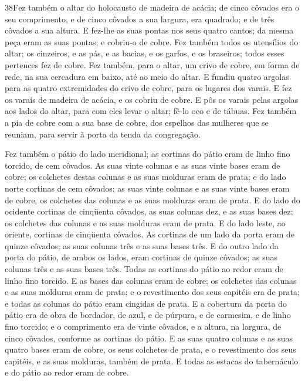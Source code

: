 \medskip

\lettrine{38} Fez também o altar do holocausto de madeira de
acácia; de cinco côvados era o seu comprimento, e de cinco côvados a
sua largura, era quadrado; e de três côvados a sua altura. E
fez-lhe as suas pontas nos seus quatro cantos; da mesma peça eram as
suas pontas; e cobriu-o de cobre. Fez também todos os utensílios
do altar; os cinzeiros, e as pás, e as bacias, e os garfos, e os
braseiros; todos esses pertences fez de cobre. Fez também, para
o altar, um crivo de cobre, em forma de rede, na sua cercadura em
baixo, até ao meio do altar. E fundiu quatro argolas para as
quatro extremidades do crivo de cobre, para os lugares dos varais.
E fez os varais de madeira de acácia, e os cobriu de cobre.
E pôs os varais pelas argolas aos lados do altar, para com eles
levar o altar; fê-lo oco e de tábuas. Fez também a pia de cobre
com a sua base de cobre, dos espelhos das mulheres que se reuniam,
para servir à porta da tenda da congregação.

Fez também o pátio do lado meridional; as cortinas do pátio eram
de linho fino torcido, de cem côvados. As suas vinte colunas
e as suas vinte bases eram de cobre; os colchetes destas colunas e
as suas molduras eram de prata; e do lado norte cortinas de
cem côvados; as suas vinte colunas e as suas vinte bases eram de
cobre, os colchetes das colunas e as suas molduras eram de prata.
E do lado do ocidente cortinas de cinqüenta côvados, as suas
colunas dez, e as suas bases dez; os colchetes das colunas e as suas
molduras eram de prata. E do lado leste, ao oriente, cortinas
de cinqüenta côvados. As cortinas de um lado da porta eram de
quinze côvados; as suas colunas três e as suas bases três. E
do outro lado da porta do pátio, de ambos os lados, eram cortinas de
quinze côvados; as suas colunas três e as suas bases três.
Todas as cortinas do pátio ao redor eram de linho fino
torcido. E as bases das colunas eram de cobre; os colchetes
das colunas e as suas molduras eram de prata; e o revestimento dos
seus capitéis era de prata; e todas as colunas do pátio eram
cingidas de prata. E a cobertura da porta do pátio era de
obra de bordador, de azul, e de púrpura, e de carmesim, e de linho
fino torcido; e o comprimento era de vinte côvados, e a altura, na
largura, de cinco côvados, conforme as cortinas do pátio. E
as suas quatro colunas e as suas quatro bases eram de cobre, os seus
colchetes de prata, e o revestimento dos seus capitéis, e as suas
molduras, também de prata. E todas as estacas do tabernáculo
e do pátio ao redor eram de cobre.

